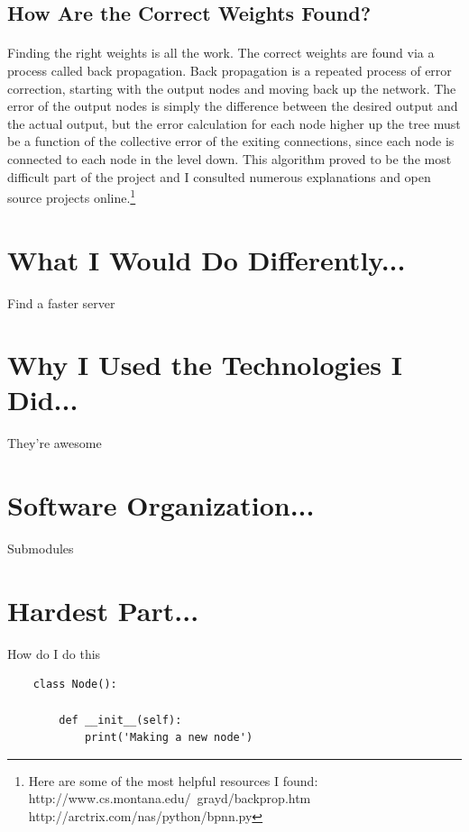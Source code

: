 \documentclass{article}
\begin{document}
\subsection{How Are the Correct Weights Found?}
    \paragraph{}Finding the right weights is all the work. The correct weights are found
    via a process called back propagation. Back propagation is a repeated process of error 
    correction, starting with the output nodes and moving back up the network. The error
    of the output nodes is simply the difference between the desired output and the actual
    output, but the error calculation for each node higher up the tree must be a function
    of the collective error of the exiting connections, since each node is connected to each
    node in the level down. This algorithm proved to be the most difficult part of the project
    and I consulted numerous explanations and open source projects online.\footnote{Here are some
    of the most helpful resources I found: \\  http://www.cs.montana.edu/~grayd/backprop.htm \\ http://arctrix.com/nas/python/bpnn.py}

\section{What I Would Do Differently...}
    Find a faster server

\section{Why I Used the Technologies I Did...}
    They're awesome

\section{Software Organization...}
    Submodules

\section{Hardest Part...}
    How do I do this
    \begin{lstlisting}
    class Node():
        
        def __init__(self):
            print('Making a new node')
    \end{lstlisting}
\end{document}
